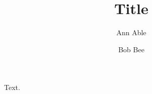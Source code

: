 \documentclass{amsart}
\begin{document}
\title{Title}
\author{Ann Able}
\address{University of A}
\author{Bob Bee}
\address{University of B}
\maketitle
Text.
\end{document}
